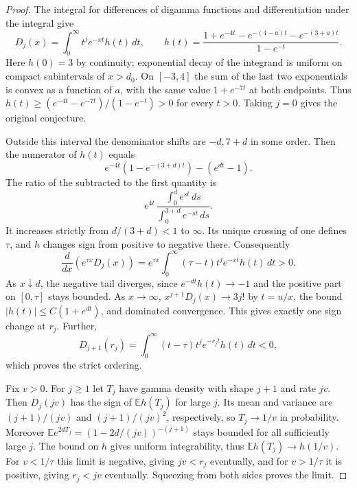 \documentclass[11pt,a4paper]{article}
\numberwithin{equation}{section}
\theoremstyle{definition}
\theoremstyle{remark}
\begin{document}
\begin{proof}
The integral for differences of digamma functions and differentiation under the integral give
\[
 D_j(x)=\int_0^\infty t^j e^{-xt}h(t)\,dt,\qquad
 h(t)=\frac{1+e^{-4t}-e^{-(4-a)t}-e^{-(3+a)t}}{1-e^{-t}}.
\]
Here $h(0)=3$ by continuity; exponential decay of the integrand is uniform on compact subintervals of $x>d_0$. On $[-3,4]$ the sum of the last two exponentials is convex as a function of $a$, with the same value $1+e^{-7t}$ at both endpoints. Thus $h(t)\ge(e^{-4t}-e^{-7t})/(1-e^{-t})>0$ for every $t>0$. Taking $j=0$ gives the original conjecture.

Outside this interval the denominator shifts are $-d,7+d$ in some order. Then the numerator of $h(t)$ equals
\[
 e^{-4t}(1-e^{-(3+d)t})-(e^{dt}-1).
\]
The ratio of the subtracted to the first quantity is
\[
 e^{4t}\,\frac{\int_0^d e^{st}\,ds}{\int_0^{3+d}e^{-st}\,ds}.
\]
It increases strictly from $d/(3+d)<1$ to $\infty$. Its unique crossing of one defines $\tau$, and $h$ changes sign from positive to negative there. Consequently
\[
 \frac{d}{dx}(e^{\tau x}D_j(x))
 =e^{\tau x}\int_0^\infty (\tau-t)t^je^{-xt}h(t)\,dt>0.
\]
As $x\downarrow d$, the negative tail diverges, since $e^{-dt}h(t)\to-1$ and the positive part on $[0,\tau]$ stays bounded. As $x\to\infty$, $x^{j+1}D_j(x)\to 3j!$ by $t=u/x$, the bound $|h(t)|\le C(1+e^{dt})$, and dominated convergence. This gives exactly one sign change at $r_j$. Further,
\[
 D_{j+1}(r_j)=\int_0^\infty(t-\tau)t^je^{-r_jt}h(t)\,dt<0,
\]
which proves the strict ordering.

Fix $v>0$. For $j\ge1$ let $T_j$ have gamma density with shape $j+1$ and rate $jv$. Then $D_j(jv)$ has the sign of $\mathbb E h(T_j)$ for large $j$. Its mean and variance are $(j+1)/(jv)$ and $(j+1)/(jv)^2$, respectively, so $T_j\to 1/v$ in probability. Moreover $\mathbb E e^{2dT_j}=(1-2d/(jv))^{-(j+1)}$ stays bounded for all sufficiently large $j$. The bound on $h$ gives uniform integrability, thus $\mathbb E h(T_j)\to h(1/v)$. For $v<1/\tau$ this limit is negative, giving $jv<r_j$ eventually, and for $v>1/\tau$ it is positive, giving $r_j<jv$ eventually. Squeezing from both sides proves the limit.
\end{proof}
\end{document}
